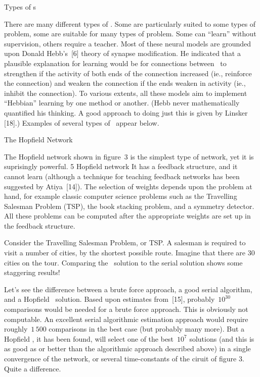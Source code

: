 \sec Types of \NN s

There are many different types of \nns.
Some are particularly suited to some types of problem, some are suitable
for many types of problem.
Some can ``learn'' without supervision, others require a teacher.
Most of these neural models are grounded upon Donald
Hebb's~[6] theory of synapse modification.
He indicated that a plausible explanation for learning would be for
connections between \neus\ to strengthen if the activity of both ends of
the connection increased (ie., reinforce the connection) and weaken the
connection if the ends weaken in activity (ie., inhibit the connection).
To various extents, all these models aim to implement ``Hebbian''
learning by one method or another.
(Hebb never mathematically quantified his thinking.
A good approach to doing just this is given by Linsker [18].)
Examples of several types of \nns\ appear below.

\ssec The Hopfield Network

The Hopfield network shown in figure~3 is the simplest type of network,
yet it is suprisingly powerful.
 {5} {Hopfield network}
It has a feedback structure, and it cannot learn (although a technique
for teaching feedback networks has been suggested by Atiya~[14]).
The selection of weights depends upon the problem at hand, for example
classic computer science problems such as the Travelling Salesman
Problem (TSP), the book stacking problem, and a symmetry detector.
All these problems can be computed after the appropriate weights are set
up in the feedback structure.

Consider the Travelling Salesman Problem, or TSP.
A salesman is required to visit a number of cities, by the shortest
possible route.
Imagine that there are 30 cities on the tour.
Comparing the \nn\ solution to the serial solution shows some staggering
results!

Let's see the difference between a brute force approach, a good serial
algorithm, and a Hopfield \nn\ solution.
Based upon estimates from~[15],
probably~$10^{30}$ comparisons would be needed for a brute force
approach.
This is obviously not computable.
An excellent serial algorithmic estimation approach would 
require roughly~$1\,500$
comparisons in the best case (but probably many more).
But a Hopfield \nn, it has been found, will select one of the
best~$10^7$ solutions (and this is as good as or better than the algorithmic
approach described above) in a single convergence of the network, or
several time-constants of the ciruit of figure 3.
Quite a difference.

